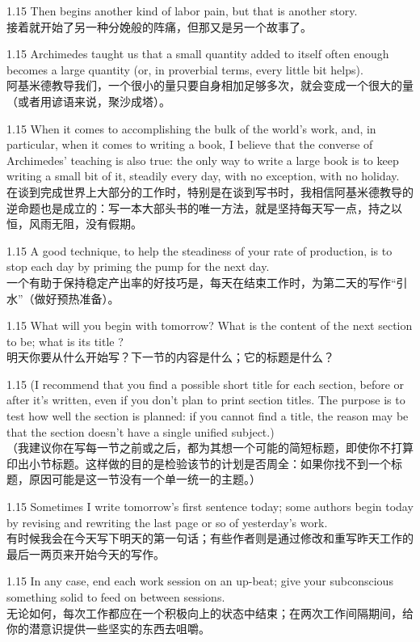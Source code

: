 \documentclass[12pt,a4paper]{article}
\newcommand{\bilingual}[2]{
    \begin{spacing}{1.15} %
        \noindent \normalsize #1 \\[-0.5ex] %
        \small \textcolor{blue!70!black}{#2} %
    \end{spacing}
    \vspace{0.8em} %
}
\begin{document}
\bilingual{Then begins another kind of labor pain, but that is another story.}
{接着就开始了另一种分娩般的阵痛，但那又是另一个故事了。} %

\bilingual{Archimedes taught us that a small quantity added to itself often enough becomes a large quantity (or, in proverbial terms, every little bit helps).}
{阿基米德教导我们，一个很小的量只要自身相加足够多次，就会变成一个很大的量（或者用谚语来说，聚沙成塔）。} %

\bilingual{When it comes to accomplishing the bulk of the world's work, and, in particular, when it comes to writing a book, I believe that the converse of Archimedes' teaching is also true: the only way to write a large book is to keep writing a small bit of it, steadily every day, with no exception, with no holiday.}
{在谈到完成世界上大部分的工作时，特别是在谈到写书时，我相信阿基米德教导的逆命题也是成立的：写一本大部头书的唯一方法，就是坚持每天写一点，持之以恒，风雨无阻，没有假期。} %

\bilingual{A good technique, to help the steadiness of your rate of production, is to stop each day by priming the pump for the next day.}
{一个有助于保持稳定产出率的好技巧是，每天在结束工作时，为第二天的写作“引水”（做好预热准备）。} %

\bilingual{What will you begin with tomorrow? What is the content of the next section to be; what is its title ?}
{明天你要从什么开始写？下一节的内容是什么；它的标题是什么？} %

\bilingual{(I recommend that you find a possible short title for each section, before or after it's written, even if you don't plan to print section titles. The purpose is to test how well the section is planned: if you cannot find a title, the reason may be that the section doesn't have a single unified subject.)}
{（我建议你在写每一节之前或之后，都为其想一个可能的简短标题，即使你不打算印出小节标题。这样做的目的是检验该节的计划是否周全：如果你找不到一个标题，原因可能是这一节没有一个单一统一的主题。）} %

\bilingual{Sometimes I write tomorrow's first sentence today; some authors begin today by revising and rewriting the last page or so of yesterday's work.}
{有时候我会在今天写下明天的第一句话；有些作者则是通过修改和重写昨天工作的最后一两页来开始今天的写作。} %

\bilingual{In any case, end each work session on an up-beat; give your subconscious something solid to feed on between sessions.}
{无论如何，每次工作都应在一个积极向上的状态中结束；在两次工作间隔期间，给你的潜意识提供一些坚实的东西去咀嚼。} %
\end{document}
